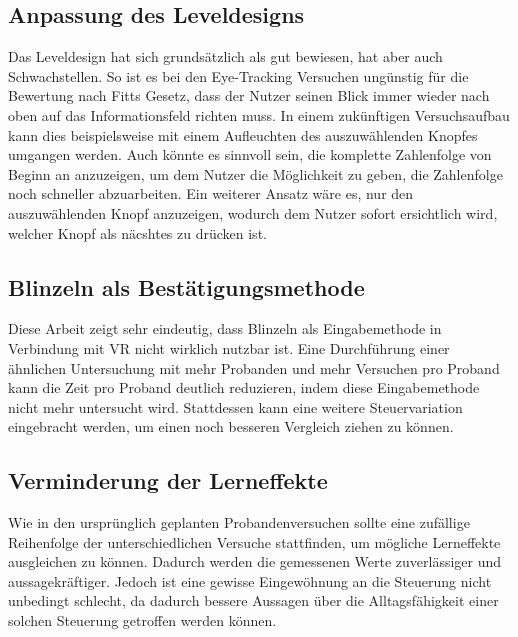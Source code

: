 \subsection{Anpassung des Leveldesigns}
Das Leveldesign hat sich grundsätzlich als gut bewiesen, hat aber auch Schwachstellen. So ist es bei den Eye-Tracking Versuchen ungünstig für die Bewertung nach Fitts Gesetz, dass der Nutzer seinen Blick immer wieder nach oben auf das Informationsfeld richten muss. In einem zukünftigen Versuchsaufbau kann dies beispielsweise mit einem Aufleuchten des auszuwählenden Knopfes umgangen werden. Auch könnte es sinnvoll sein, die komplette Zahlenfolge von Beginn an anzuzeigen, um dem Nutzer die Möglichkeit zu geben, die Zahlenfolge noch schneller abzuarbeiten. Ein weiterer Ansatz wäre es, nur den auszuwählenden Knopf anzuzeigen, wodurch dem Nutzer sofort ersichtlich wird, welcher Knopf als näcshtes zu drücken ist.

\subsection{Blinzeln als Bestätigungsmethode}
Diese Arbeit zeigt sehr eindeutig, dass Blinzeln als Eingabemethode in Verbindung mit VR nicht wirklich nutzbar ist. Eine Durchführung einer ähnlichen Untersuchung mit mehr Probanden und mehr Versuchen pro Proband kann die Zeit pro Proband deutlich reduzieren, indem diese Eingabemethode nicht mehr untersucht wird. Stattdessen kann eine weitere Steuervariation eingebracht werden, um einen noch besseren Vergleich ziehen zu können. 

\subsection{Verminderung der Lerneffekte}
Wie in den ursprünglich geplanten Probandenversuchen sollte eine zufällige Reihenfolge der unterschiedlichen Versuche stattfinden, um mögliche Lerneffekte ausgleichen zu können. Dadurch werden die gemessenen Werte zuverlässiger und aussagekräftiger. Jedoch ist eine gewisse Eingewöhnung an die Steuerung nicht unbedingt schlecht, da dadurch bessere Aussagen über die Alltagsfähigkeit einer solchen Steuerung getroffen werden können. 
